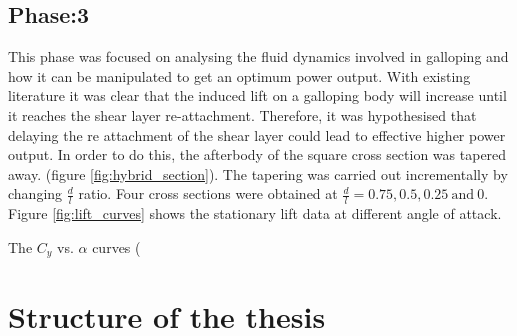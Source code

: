 \documentclass[authoryear,12pt]{article}
\newcommand{\ratio}{\ensuremath{\frac{d}{l}}}
\begin{document}
\clearpage

\subsection{Phase:3}

This phase was focused on analysing the fluid dynamics involved in galloping and how it can be manipulated to get an optimum power output. With existing literature it was clear that the induced lift on a galloping body will increase until it reaches the shear layer re-attachment. Therefore, it was hypothesised that delaying the re attachment of the shear layer could lead to effective higher power output. In order to do this, the afterbody of the square cross section was tapered away. (figure \ref{fig:hybrid_section}). The tapering was carried out incrementally by changing $\frac{d}{l}$ ratio. Four cross sections were obtained at $\frac{d}{l}= 0.75,0.5,0.25 \ \text{and} \ 0$. Figure \ref{fig:lift_curves} shows the stationary lift data at different angle of attack. 

 \vspace{30mm}
%



The $C_y$ vs. $\alpha$ curves ( %

%






\clearpage

\section{Structure of the thesis}
\end{document}
